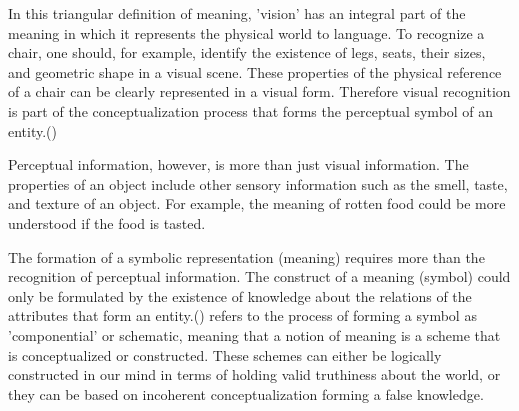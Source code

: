 \documentclass[11pt, a4paper]{article}
\begin{document}

In this triangular definition of meaning, 'vision' has an integral part of the meaning in which it represents the physical world to language. To recognize a chair, one should, for example, identify the existence of legs, seats, their sizes, and geometric shape in a visual scene. %
These properties of the physical reference of a chair can be clearly represented in a visual form. Therefore visual recognition is part of the conceptualization process that forms the perceptual symbol of an entity.(\cite{barsalou1999perceptual})

Perceptual information, however, is more than just visual information. The properties of an object include other sensory information such as the smell, taste, and texture of an object. For example, the meaning of rotten food could be more understood if the food is tasted.

The formation of a symbolic representation (meaning) requires more than the recognition of perceptual information. The construct of a meaning (symbol) could only be formulated by the existence of knowledge about the relations of the attributes that form an entity.(\cite{barsalou1999perceptual}) refers to the process of forming a symbol as 'componential' or schematic, meaning that a  notion of meaning is a scheme that is conceptualized or constructed. These schemes can either be logically constructed in our mind in terms of holding valid truthiness about the world, or they can be based on incoherent conceptualization forming a false knowledge. 
\end{document}
